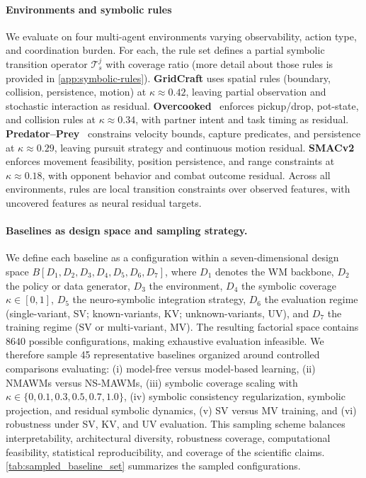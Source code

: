 \documentclass{article}
\theoremstyle{plain}
\theoremstyle{definition}
\theoremstyle{remark}
\begin{document}

\paragraph{Environments and symbolic rules}
\label{sec:envs}

We evaluate on four multi-agent environments varying observability, action type, and coordination burden. For each, the rule set defines a partial symbolic transition operator $\mathcal{T}^j_s$ with coverage ratio (more detail about those rules is provided in \autoref{app:symbolic-rules}).
\textbf{GridCraft}\hyperref[fn:gridcraft]{\footnotemark[2]} uses spatial rules (boundary, collision, persistence, motion) at $\kappa\approx0.42$, leaving partial observation and stochastic interaction as residual. \textbf{Overcooked}~\cite{Micah2020overcooked} enforces pickup/drop, pot-state, and collision rules at $\kappa\approx0.34$, with partner intent and task timing as residual. \textbf{Predator--Prey}~\cite{lowe2017multi} constrains velocity bounds, capture predicates, and persistence at $\kappa\approx0.29$, leaving pursuit strategy and continuous motion residual. \textbf{SMACv2}~\cite{Ellis2023smacv2} enforces movement feasibility, position persistence, and range constraints at $\kappa\approx0.18$, with opponent behavior and combat outcome residual. Across all environments, rules are local transition constraints over observed features, with uncovered features as neural residual targets.

\paragraph{Baselines as design space and sampling strategy.}
We define each baseline as a configuration within a seven-dimensional design space $B[D_1,D_2,D_3,D_4,D_5,D_6,D_7]$, where $D_1$ denotes the WM backbone, $D_2$ the policy or data generator, $D_3$ the environment, $D_4$ the symbolic coverage $\kappa \in [0,1]$, $D_5$ the neuro-symbolic integration strategy, $D_6$ the evaluation regime (single-variant, SV; known-variants, KV; unknown-variants, UV), and $D_7$ the training regime (SV or multi-variant, MV). The resulting factorial space contains $8640$ possible configurations, making exhaustive evaluation infeasible. We therefore sample 45 representative baselines organized around controlled comparisons evaluating: (i) model-free versus model-based learning, (ii) NMAWMs versus NS-MAWMs, (iii) symbolic coverage scaling with $\kappa \in \{0,0.1,0.3,0.5,0.7,1.0\}$, (iv) symbolic consistency regularization, symbolic projection, and residual symbolic dynamics, (v) SV versus MV training, and (vi) robustness under SV, KV, and UV evaluation. This sampling scheme balances interpretability, architectural diversity, robustness coverage, computational feasibility, statistical reproducibility, and coverage of the scientific claims. \autoref{tab:sampled_baseline_set} summarizes the sampled configurations.
\end{document}
